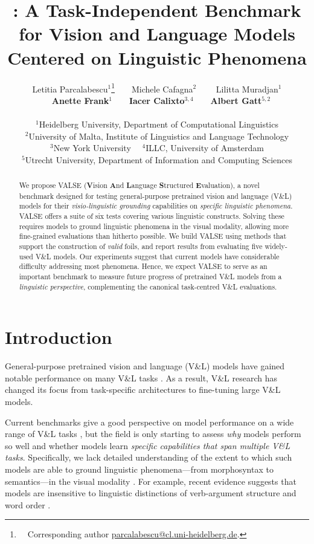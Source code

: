 \documentclass[11pt]{article}
\title{\dataset{} \dancer: A Task-Independent Benchmark for Vision and Language Models Centered on Linguistic Phenomena}
\author{Letitia Parcalabescu$^1$\thanks{~~Corresponding author \url{parcalabescu@cl.uni-heidelberg.de}.}\ \ ~~Michele Cafagna$^2$ \ \ ~~Lilitta Muradjan$^1$ \\ ~~\textbf{Anette Frank}$^1$\ \ ~~\textbf{Iacer Calixto}$^{3,4}$\ \ ~~\textbf{Albert Gatt}$^{5,2}$ \\\\
$^1$Heidelberg University, Department of Computational Linguistics\\ 
$^2$University of Malta, Institute of Linguistics and Language Technology \\
$^3$New York University \ \ 
$^4$ILLC, University of Amsterdam\\
$^5$Utrecht University, Department of Information and Computing Sciences}
\date{}
\newcommand{\dataset}{VALSE}
\begin{document}
\maketitle

\begin{abstract}
We propose \dataset{} (\textbf{V}ision \textbf{A}nd \textbf{L}anguage \textbf{S}tructured \textbf{E}valuation), a novel benchmark designed for 
testing general-purpose pretrained vision and language (V\&L) models for their {\em visio-linguistic grounding} capabilities on {\em specific linguistic phenomena}. 
\dataset{} 
offers a suite of six tests covering various 
linguistic constructs. Solving these 
requires models to ground linguistic phenomena in the visual modality, allowing more fine-grained evaluations than hitherto possible.
We build \dataset{} using methods that support the construction of \textit{valid}
foils, and report results from evaluating five widely-used V\&L models.
Our experiments suggest that current models have considerable difficulty addressing most phenomena.
Hence, we expect \dataset{} to serve as an important benchmark to measure future progress of pretrained V\&L models from a \textit{linguistic perspective}, complementing the canonical task-centred V\&L evaluations.
\end{abstract}


\section{Introduction}\label{sec:intro}
General-purpose pretrained vision and language (V\&L) models have gained notable performance on many V\&L tasks
\cite{lu2019vilbert,tan-bansal-2019-lxmert,li2019visualbert,chen2020uniter,Li-etal-2020unicodervl,Su2020VL-BERT}.
As a result, 
V\&L research has changed its focus
from task-specific
architectures 
to fine-tuning
large
V\&L models.


Current benchmarks give a good perspective on 
model performance on a wide range of 
V\&L tasks \citep{cao2020behind,lourie2021unicorn,li2021value}, but the field is only starting to assess \emph{why} models perform so well 
and whether models learn \emph{specific capabilities that span multiple V\&L tasks}. 
Specifically, we lack detailed understanding of the extent to which such models are able to ground 
linguistic phenomena---from
morphosyntax 
to semantics---in the visual modality \cite{Bernardi2021}. For example, recent evidence suggests that models are insensitive to linguistic distinctions 
of verb-argument structure \cite{Hendricks2021} and word order \cite{cirik-etal-2018-visual, akula-etal-2020-words}.
\end{document}
